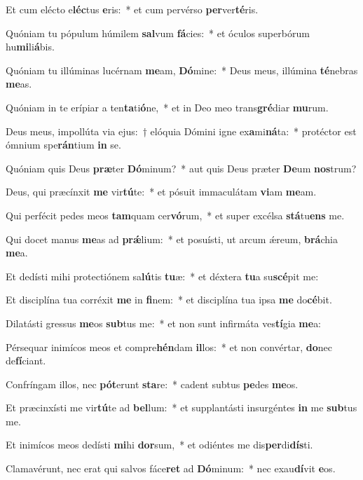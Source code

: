\item Et cum elécto e\textbf{léc}tus \textbf{e}ris:~* et cum pervérso \textbf{per}ver\textbf{té}ris.
\item Quóniam tu pópulum húmilem \textbf{sal}vum \textbf{fá}cies:~* et óculos superbórum hu\textbf{mi}li\textbf{á}bis.
\item Quóniam tu illúminas lucérnam \textbf{me}am, \textbf{Dó}mine:~* Deus meus, illúmina \textbf{té}nebras \textbf{me}as.
\item Quóniam in te erípiar a ten\textbf{ta}ti\textbf{ó}ne,~* et in Deo meo trans\textbf{gré}diar \textbf{mu}rum.
\item Deus meus, impollúta via ejus:~† elóquia Dómini igne ex\textbf{a}mi\textbf{ná}ta:~* protéctor est ómnium spe\textbf{rán}tium \textbf{in} se.
\item Quóniam quis Deus \textbf{præ}ter \textbf{Dó}minum?~* aut quis Deus præter \textbf{De}um \textbf{nos}trum?
\item Deus, qui præcínxit \textbf{me} vir\textbf{tú}te:~* et pósuit immaculátam \textbf{vi}am \textbf{me}am.
\item Qui perfécit pedes meos \textbf{tam}quam cer\textbf{vó}rum,~* et super excélsa \textbf{stá}tu\textbf{ens} me.
\item Qui docet manus \textbf{me}as ad \textbf{prǽ}lium:~* et posuísti, ut arcum ǽreum, \textbf{brá}chia \textbf{me}a.
\item Et dedísti mihi protectiónem sa\textbf{lú}tis \textbf{tu}æ:~* et déxtera \textbf{tu}a su\textbf{scé}pit me:
\item Et disciplína tua corréxit \textbf{me} in \textbf{fi}nem:~* et disciplína tua ipsa \textbf{me} do\textbf{cé}bit.
\item Dilatásti gressus \textbf{me}os \textbf{sub}tus me:~* et non sunt infirmáta ves\textbf{tí}gia \textbf{me}a:
\item Pérsequar inimícos meos et compre\textbf{hén}dam \textbf{il}los:~* et non convértar, \textbf{do}nec de\textbf{fí}ciant.
\item Confríngam illos, nec \textbf{pót}erunt \textbf{sta}re:~* cadent subtus \textbf{pe}des \textbf{me}os.
\item Et præcinxísti me vir\textbf{tú}te ad \textbf{bel}lum:~* et supplantásti insurgéntes \textbf{in} me \textbf{sub}tus me.
\item Et inimícos meos dedísti \textbf{mi}hi \textbf{dor}sum,~* et odiéntes me dis\textbf{per}di\textbf{dís}ti.
\item Clamavérunt, nec erat qui salvos fáce\textbf{ret} ad \textbf{Dó}minum:~* nec exau\textbf{dí}vit \textbf{e}os.
